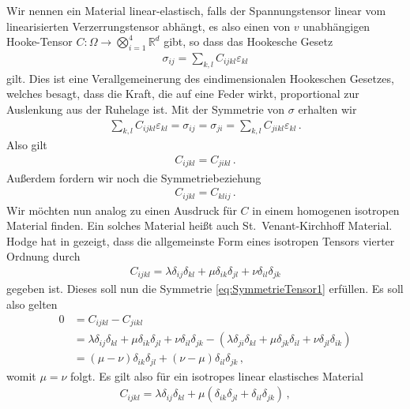 \documentclass{scrartcl}
\def\R{\mathbb{R}}
\def\e{\varepsilon}
\begin{document}
Wir nennen ein Material linear-elastisch, falls der Spannungstensor linear vom lineari\-sierten Verzerrungstensor abhängt, es also einen von $v$ unabhängigen Hooke-Tensor
$C\colon\Omega\to\bigotimes_{i=1}^4\R^d$ gibt,
so dass das Hookesche Gesetz
\begin{align}
	\sigma_{ij} = \sum_{k,l}C_{ijkl}\e_{kl}
	\label{eq:DefinitionHookeTensor}
\end{align}
gilt. Dies ist eine Verallgemeinerung des eindimensionalen Hookeschen Gesetzes, welches besagt, dass die Kraft, die auf eine Feder wirkt, proportional zur Auslenkung aus der Ruhelage ist.
Mit der Symmetrie von $\sigma$ erhalten wir
\begin{align*}
	\sum_{k,l}C_{ijkl}\e_{kl}= \sigma_{ij} = \sigma_{ji} = \sum_{k,l}C_{jikl}\e_{kl}\,.
\end{align*}
Also gilt
\begin{align}
	C_{ijkl}=C_{jikl}\,.
	\label{eq:SymmetrieTensor1}
\end{align}
Außerdem fordern wir noch die Symmetriebeziehung
\begin{align}
	C_{ijkl} = C_{klij}\,.
	\label{eq:SymmetrieTensor2}
\end{align}
Wir möchten nun analog zu \cite[S.120]{Mar-2003} einen Ausdruck für $C$ in einem homogenen isotropen Material finden. Ein solches Material heißt auch St.\ Venant-Kirchhoff Material. Hodge hat in \cite{Hod-1961} gezeigt, dass die allgemeinste Form eines isotropen Tensors vierter Ordnung durch 
\begin{align*}
	C_{ijkl} = \lambda\delta_{ij}\delta_{kl}+\mu\delta_{ik}\delta_{jl}+\nu\delta_{il}\delta_{jk}
\end{align*}
gegeben ist. Dieses soll nun die Symmetrie \eqref{eq:SymmetrieTensor1} erfüllen. Es soll also gelten
\begin{align*}
	0&= C_{ijkl}-C_{jikl} \\
	&= \lambda\delta_{ij}\delta_{kl}+\mu\delta_{ik}\delta_{jl}+\nu\delta_{il}\delta_{jk} 
	- (\lambda\delta_{ji}\delta_{kl}+\mu\delta_{jk}\delta_{il}+\nu\delta_{jl}\delta_{ik}) \\
	&= (\mu-\nu)\delta_{ik}\delta_{jl}+(\nu-\mu)\delta_{il}\delta_{jk}\,,
\end{align*}
womit $\mu=\nu$ folgt.
Es gilt also für ein isotropes linear elastisches Material
\begin{align}
	C_{ijkl}=\lambda\delta_{ij}\delta_{kl}+\mu(\delta_{ik}\delta_{jl}+\delta_{il}\delta_{jk})\,,
	\label{eq:DefinitionHookeIsotropicMaterial}
\end{align}
\end{document}
